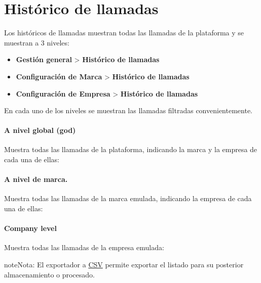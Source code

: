 \documentclass[letterpaper,10pt,spanish]{sphinxmanual}
\begin{document}
\section{Histórico de llamadas}
\label{billing_and_invoices/call_registry::doc}\label{billing_and_invoices/call_registry:call-registry}\label{billing_and_invoices/call_registry:id1}
Los históricos de llamadas muestran todas las llamadas de la plataforma y se muestran a 3 niveles:
\begin{itemize}
\item {} 
\textbf{Gestión general} \textgreater{} \textbf{Histórico de llamadas}

\item {} 
\textbf{Configuración de Marca} \textgreater{} \textbf{Histórico de llamadas}

\item {} 
\textbf{Configuración de Empresa} \textgreater{} \textbf{Histórico de llamadas}

\end{itemize}

En cada uno de los niveles se muestran las llamadas filtradas convenientemente.
\paragraph{A nivel global (god)}

Muestra todas las llamadas de la plataforma, indicando la marca y la empresa de cada una de ellas:

\noindent{}
\paragraph{A nivel de marca.}

Muestra todas las llamadas de la marca emulada, indicando la empresa de cada una de ellas:

\noindent{}
\paragraph{Company level}

Muestra todas las llamadas de la empresa emulada:

\noindent{}

\begin{notice}{note}{Nota:}
El exportador a \href{https://es.wikipedia.org/wiki/CSV}{CSV} permite exportar el listado para su posterior almacenamiento o procesado.
\end{notice}
\end{document}
